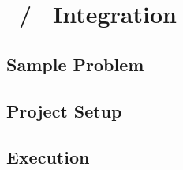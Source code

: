 \chapter{\csharp\ / \fsharp\ Integration}


\section{Sample Problem}

\section{Project Setup}

\section{Execution}

